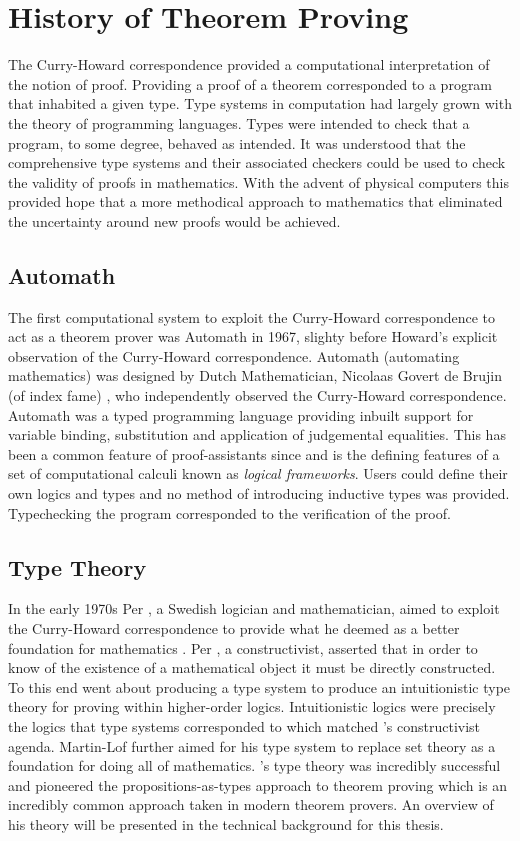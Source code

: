 \section{History of Theorem Proving}
The Curry-Howard correspondence provided a computational interpretation of the
notion of proof. Providing a proof of a theorem corresponded to a program that
inhabited a given type. Type systems in computation had largely grown with the
theory of programming languages. Types were intended to check that a program, to
some degree, behaved as intended. It was understood that the comprehensive type
systems and their associated checkers could be used to check the validity of
proofs in mathematics. With the advent of physical computers this provided hope
that a more methodical approach to mathematics that eliminated the uncertainty
around new proofs would be achieved.
\subsection{Automath}
The first computational system to exploit the Curry-Howard correspondence to act as
a theorem prover was Automath in 1967, slighty before Howard's explicit
observation of the Curry-Howard correspondence. Automath (automating
mathematics) was designed by Dutch Mathematician, Nicolaas Govert de Brujin (of
index fame) \cite{de1983automath}, who independently observed the Curry-Howard correspondence.
Automath was a typed programming language providing inbuilt support for variable
binding, substitution and application of judgemental equalities. This has been
a common feature of proof-assistants since and is the defining features of
a set of computational calculi known as \textit{logical frameworks}. Users could
define their own logics and types and no method of introducing inductive types
was provided. Typechecking the program corresponded to the verification of the
proof.
\subsection{\mlt{} Type Theory}
In the early 1970s Per \mlt, a Swedish logician and mathematician, aimed
to exploit the Curry-Howard correspondence to provide what he deemed as a better
foundation for mathematics \cite{martin1984intuitionistic}. Per \mlt, a constructivist, asserted that in
order to know of the existence of a mathematical object it must be directly
constructed. To this end \mlt{} went about producing a type system to
produce an intuitionistic type theory for proving within higher-order logics.
Intuitionistic logics were precisely the logics that type systems corresponded
to which matched \mlt's constructivist agenda. Martin-Lof further aimed
for his type system to replace set theory as a foundation for doing all of
mathematics. \mlt's type theory was incredibly successful and pioneered
the propositions-as-types approach to theorem proving which is an incredibly
common approach taken in modern theorem provers. An overview of his theory will
be presented in the technical background for this thesis.

